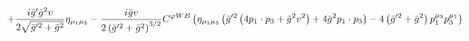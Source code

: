 %
\begin{dmath*}
%
  +  \frac{i {\bar g}^\prime {\bar g}{}^2 v}{2 \sqrt{{\bar g}^{\prime 2} + {\bar g}{}^2}}\eta_{\mu_1 \mu_3}  -  \frac{i {\bar g}{} v}{2 \left({\bar g}^{\prime 2} + {\bar g}{}^2\right)^{3/2}}C^{ \varphi  WB} \left(\eta_{\mu_1 \mu_3} \left({\bar g}^{\prime 2} \left(4 p_{1}\nobreak\cdot\nobreak{}p_{3} + {\bar g}{}^2 v^2\right) + 4 {\bar g}{}^2 p_{1}\nobreak\cdot\nobreak{}p_{3}\right) - 4 \left({\bar g}^{\prime 2} + {\bar g}{}^2\right) p_1^{\mu_3} p_3^{\mu_1}\right)
%
\end{dmath*}
%
